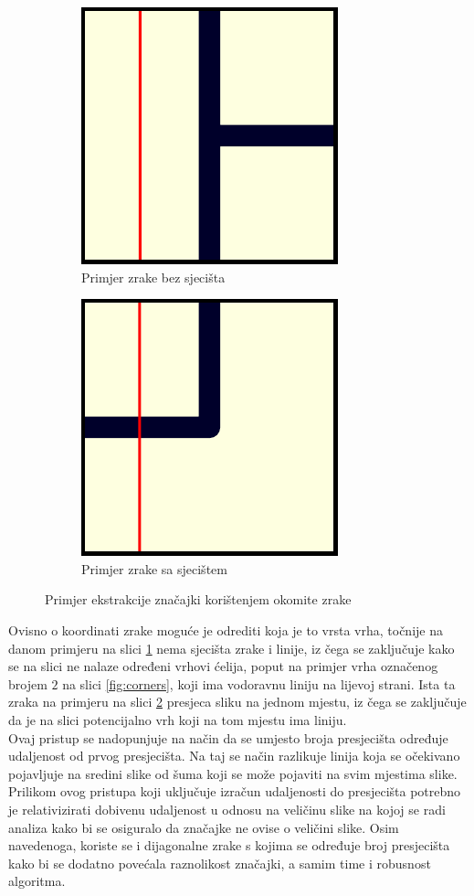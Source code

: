 \documentclass[times, utf8, zavrsni, numeric]{fer}
\begin{document}
\begin{figure}[th!]
    \centering
    \begin{subfigure}{.5\textwidth}
        \centering
        \includegraphics[width=.3\linewidth]{Images/LineFeature.pdf}
        \captionsetup{justification=centering}
        \caption{Primjer zrake bez sjecišta}
        \label{fig:feature1}
    \end{subfigure}%
    \begin{subfigure}{.5\textwidth}
        \centering
        \includegraphics[width=.3\linewidth]{Images/LineFeature1.pdf}
        \captionsetup{justification=centering}
        \caption{Primjer zrake sa sjecištem}
        \label{fig:feature2}
    \end{subfigure}
    \caption{Primjer ekstrakcije značajki korištenjem okomite zrake}
    \label{fig:lineFeatures}
\end{figure}

Ovisno o koordinati zrake moguće je odrediti koja je to vrsta vrha, točnije na danom primjeru na slici \ref{fig:feature1} nema sjecišta zrake i linije, iz čega se zaključuje kako se na slici ne nalaze određeni vrhovi ćelija, poput na primjer vrha označenog brojem $2$ na slici \ref{fig:corners}, koji ima vodoravnu liniju na lijevoj strani.
Ista ta zraka na primjeru na slici \ref{fig:feature2} presjeca sliku na jednom mjestu, iz čega se zaključuje da je na slici potencijalno vrh koji na tom mjestu ima liniju.\\

Ovaj pristup se nadopunjuje na način da se umjesto broja presjecišta određuje udaljenost od prvog presjecišta.
Na taj se način razlikuje linija koja se očekivano pojavljuje na sredini slike od šuma koji se može pojaviti na svim mjestima slike.
Prilikom ovog pristupa koji uključuje izračun udaljenosti do presjecišta potrebno je relativizirati dobivenu udaljenost u odnosu na veličinu slike na kojoj se radi analiza kako bi se osiguralo da značajke ne ovise o veličini slike.
Osim navedenoga, koriste se i dijagonalne zrake s kojima se određuje broj presjecišta kako bi se dodatno povećala raznolikost značajki, a samim time i robusnost algoritma.\\
\end{document}

